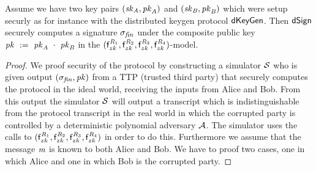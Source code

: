 \begin{theorem}\label{lem:sig:security}
Assume we have two key pairs $(\mathit{sk}_{\mathit{A}}, \mathit{pk}_{\mathit{A}})$ and $(\mathit{sk}_{\mathit{B}}, \mathit{pk}_{\mathit{B}})$ which were setup securly as for instance with the distributed keygen protocol $\mathsf{dKeyGen}$.
    Then $\mathsf{dSign}$ securely computes a signature $\sigma_{\mathit{fin}}$ under the composite public key $\mathit{pk} ~:=~ \mathit{pk}_{\mathit{A}} ~\cdot~ \mathit{pk}_{\mathit{B}}$ in the $(\mathsf{f}^{\mathit{R}_1}_{zk}, \mathsf{f}^{\mathit{R}_2}_{zk}, \mathsf{f}^{\mathit{R}_3}_{zk}, \mathsf{f}^{\mathit{R}_4}_{zk})$-model.
\end{theorem}

\begin{proof}
    We proof security of the protocol by constructing a simulator $\mathcal{S}$ who is given output $(\sigma_{\mathit{fin}}, \mathit{pk})$ from a TTP (trusted third party) that securely computes the protocol in the ideal world, receiving the inputs from Alice and Bob.
    From this output the simulator $\mathcal{S}$ will output a transcript which is indistinguishable from the protocol transcript in the real world in which the corrupted party is controlled by a deterministic polynomial adversary $\mathcal{A}$.
    The simulator uses the calls to $(\mathsf{f}^{\mathit{R}_1}_{zk}, \mathsf{f}^{\mathit{R}_2}_{zk}, \mathsf{f}^{\mathit{R}_3}_{zk}, \mathsf{f}^{\mathit{R}_4}_{zk})$ in order to do this.
    Furthermore we assume that the message $\mathit{m}$ is known to both Alice and Bob.
    We have to proof two cases, one in which Alice and one in which Bob is the corrupted party.
    

\end{proof}
